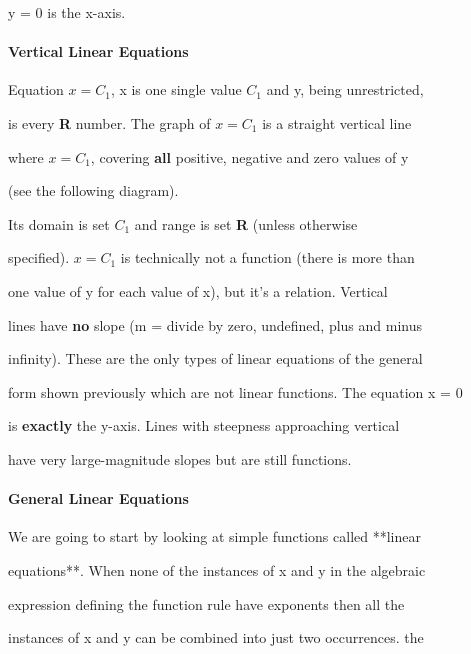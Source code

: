 y = 0 is the x-axis.



\paragraph{Vertical Linear Equations}



Equation $x = C_1$, x is one single value $C_1$ and y, being unrestricted,

is every \textbf{R} number. The graph of $x = C_1$ is a straight vertical line

where $x = C_1$, covering \textbf{all} positive, negative and zero values of y

(see the following diagram).






Its domain is set { $C_1$ } and range is set \textbf{R} (unless otherwise

specified). $x = C_1$ is technically not a function (there is more than

one value of y for each value of x), but it's a relation. Vertical

lines have \textbf{no} slope (m = divide by zero, undefined, plus and minus

infinity). These are the only types of linear equations of the general

form shown previously which are not linear functions. The equation x = 0

is \textbf{exactly} the y-axis. Lines with steepness approaching vertical

have very large-magnitude slopes but are still functions.



\paragraph{General Linear Equations}



We are going to start by looking at simple functions called **linear

equations**. When none of the instances of x and y in the algebraic

expression defining the function rule have exponents then all the

instances of x and y can be combined into just two occurrences. the

